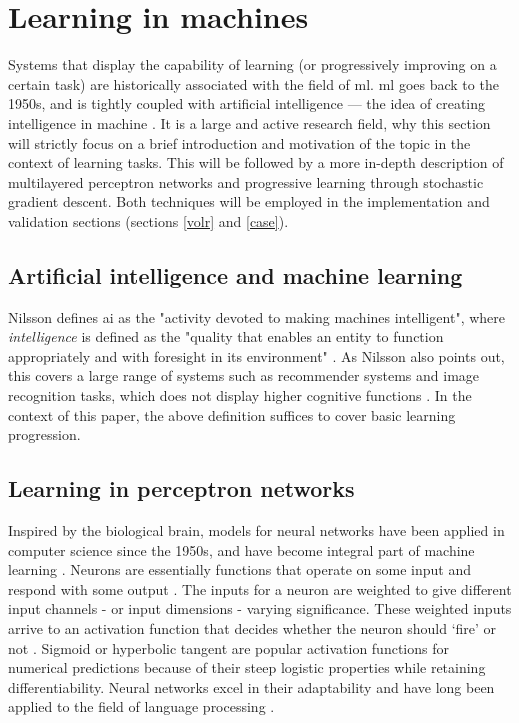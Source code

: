 \documentclass[a4paper,oneside]{memoir}
\begin{document}

\section{Learning in machines}
Systems that display the capability of learning (or progressively improving on
a certain task) are historically associated with the field of \gls{ml}.
\Gls{ml} goes back to the 1950s, and is tightly coupled
with artificial intelligence --- the idea of creating intelligence
in machine \autocite{Nilsson2009, russel2007}.
It is a large and active research field, why this section will strictly
focus on a brief introduction and motivation of the topic in the context of
learning tasks. This will be followed by a more in-depth description of
multilayered perceptron networks and progressive learning through stochastic
gradient descent. Both techniques will be employed in the implementation
and validation sections (sections \ref{volr} and \ref{case}).

\subsection{Artificial intelligence and machine learning}
Nilsson defines \gls{ai} as the "activity devoted to making machines
intelligent", where \textit{intelligence} is defined as the "quality that
enables an entity to function appropriately and with foresight in its
environment" \autocite[13]{Nilsson2009}. As Nilsson also points out, this
covers a large range of systems such as recommender systems and image recognition
tasks, which does not display higher cognitive functions \autocite[13]{Nilsson2009}.
In the context of this paper, the above definition suffices to cover basic
learning progression.

\subsection{Learning in perceptron networks}
Inspired by the biological brain, models for neural networks have been applied
in computer science since the 1950s, and have become integral part of machine
learning \autocite{Nilsson2009, Pedersen2017, russel2007}.
Neurons are essentially functions that operate on some input and respond with
some output \autocite{russel2007}. The inputs for a neuron are weighted to give
different input channels - or input dimensions - varying significance. These
weighted inputs arrive to an activation function that decides whether the
neuron should ‘fire’ or not \autocite{Nilsson2009}. Sigmoid or hyperbolic tangent
are popular
activation functions for numerical predictions because of their steep logistic
properties while retaining differentiability. Neural networks excel in their
adaptability and have long been applied to the field of language processing
\autocite{Jurafsky2000, russel2007}.
\end{document}
